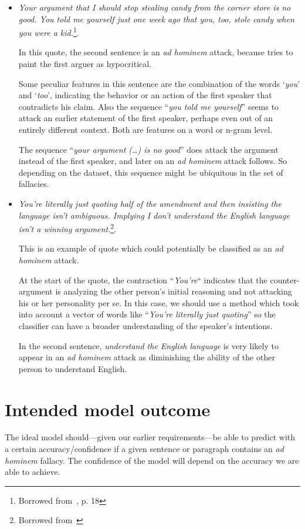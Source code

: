 \documentclass[a4paper]{article}
\begin{document}
\begin{itemize}
    \item \emph{Your argument that I should stop stealing candy from the corner store is no good. You told me yourself just one week ago that you, too, stole candy when you were a kid.}\footnote{Borrowed from~\cite{Walton1998}, p. 18}.
    
    In this quote, the second sentence is an \emph{ad hominem} attack, because tries to paint the first arguer as hypocritical. 

    Some peculiar features in this sentence are the combination of the words `\emph{you}' and `\emph{too}', indicating the behavior or an action of the first speaker  that contradicts his claim. Also the sequence ``\emph{you told me yourself}'' seems to attack an earlier statement of the first speaker, perhaps even out of an entirely different context. Both are features on a word or n-gram level.

    The sequence ``\emph{your argument (\dots) is no good}'' does attack the argument instead of the first speaker, and later on an \emph{ad hominem} attack follows. So depending on the dataset, this sequence might be ubiquitous in the set of fallacies.
    
    \item \emph{You're literally just quoting half of the amendment and then insisting the language isn't ambiguous. Implying I don't understand the English language isn't a winning argument.}\footnote{Borrowed from~\cite{Habernal.et.al.2018.NAACL.adhominem}}.
    
    This is an example of quote which could potentially be classified as an \emph{ad hominem} attack.
    
    At the start of the quote, the contraction ``\emph{You're}`` indicates that the counter-argument is analyzing the other person's initial reasoning and not attacking his or her personality per se. In this case, we should use a method which took into account a vector of words like ``\emph{You're literally just quoting}'' so the classifier can have a broader understanding of the speaker's intentions.
    
    In the second sentence, \emph{understand the English language} is very likely to appear in an \emph{ad hominem} attack as diminishing the ability of the other person to understand English. 
    
\end{itemize}
 
\section{Intended model outcome}
The ideal model should---given our earlier requirements---be able to predict with a certain accuracy/confidence if a given sentence or paragraph contains an \emph{ad hominem} fallacy. The confidence of the model will depend on the accuracy we are able to achieve. 
\end{document}
